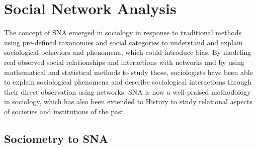\section{Social Network Analysis}\label{sec:social-network-analysis}

The concept of SNA emerged in sociology in response to traditional methods using pre-defined taxonomies and social categories to understand and explain sociological behaviors and phenomena, which could introduce bias.
By modeling real observed social relationships and interactions with networks and by using mathematical and statistical methods to study those, sociologists have been able to explain sociological phenomena and describe sociological interactions through their direct observation using networks.
SNA is now a well-praised methodology in sociology, which has also been extended to History to study relational aspects of societies and institutions of the past.

\subsection{Sociometry to SNA}

